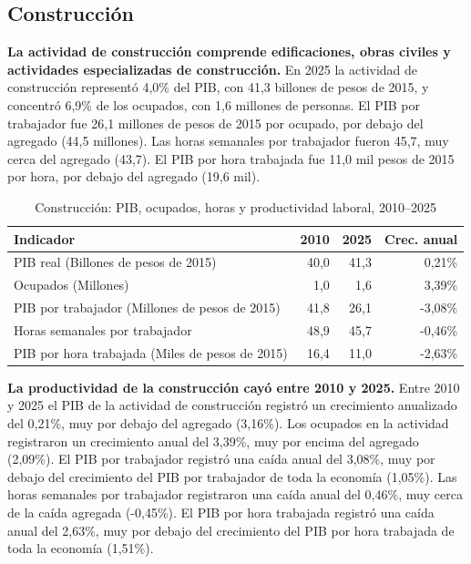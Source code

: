 \subsection{Construcción}

\textbf{La actividad de construcción comprende edificaciones, obras civiles y actividades especializadas de construcción.} En 2025 la actividad de construcción representó 4,0\% del PIB, con 41,3 billones de pesos de 2015, y concentró 6,9\% de los ocupados, con 1,6 millones de personas. El PIB por trabajador fue 26,1 millones de pesos de 2015 por ocupado, por debajo del agregado (44,5 millones). Las horas semanales por trabajador fueron 45,7, muy cerca del agregado (43,7). El PIB por hora trabajada fue 11,0 mil pesos de 2015 por hora, por debajo del agregado (19,6 mil).

\begin{table}[H]
\centering
\caption{Construcción: PIB, ocupados, horas y productividad laboral, 2010--2025}
\label{tab:sector_f_productividad}
\small
\begin{tabular}{lrrr}
\toprule
Indicador & 2010 & 2025 & Crec. anual \\
\midrule
PIB real  (Billones de pesos de 2015) & 40,0 & 41,3 & 0,21\% \\
Ocupados (Millones) & 1,0 & 1,6 & 3,39\% \\
PIB por trabajador (Millones de pesos de 2015) & 41,8 & 26,1 & -3,08\% \\
Horas semanales por trabajador & 48,9 & 45,7 & -0,46\% \\
PIB por hora trabajada (Miles de pesos de 2015) & 16,4 & 11,0 & -2,63\% \\
\bottomrule
\end{tabular}
\end{table}

\textbf{La productividad de la construcción cayó entre 2010 y 2025.} Entre 2010 y 2025 el PIB de la actividad de construcción registró un crecimiento anualizado del 0,21\%, muy por debajo del agregado (3,16\%). Los ocupados en la actividad registraron un crecimiento anual del 3,39\%, muy por encima del agregado (2,09\%). El PIB por trabajador registró una caída anual del 3,08\%, muy por debajo del crecimiento del PIB por trabajador de toda la economía (1,05\%). Las horas semanales por trabajador registraron una caída anual del 0,46\%, muy cerca de la caída agregada (-0,45\%). El PIB por hora trabajada registró una caída anual del 2,63\%, muy por debajo del crecimiento del PIB por hora trabajada de toda la economía (1,51\%).

